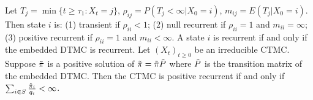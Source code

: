  Let $T_j = \min\{t \ge \tau_1 : X_t = j\}$, $\rho_{ij} = P(T_j < \infty | X_0 = i)$, $m_{ij} = E(T_j |X_0 = i).$ Then state $i$ is:
(1) transient if $\rho_{ii} < 1$;
(2) null recurrent if $\rho_{ii} = 1$ and $m_{ii} = \infty$;
(3) positive recurrent if $\rho_{ii} = 1$ and $m_{ii} < \infty$.
 A state $i$ is recurrent if and only if the embedded DTMC is recurrent.
 Let $(X_t)_{t \ge 0}$ be an irreducible CTMC. Suppose $\Tilde{\pi}$ is a positive solution of $\Tilde{\pi} = \Tilde{\pi}\Tilde{P}$ where $\Tilde{P}$ is the transition matrix of the embedded DTMC. Then the CTMC is positive recurrent if and only if $\sum_{i \in S} \frac{\Tilde{\pi}_i}{q_i} < \infty$.